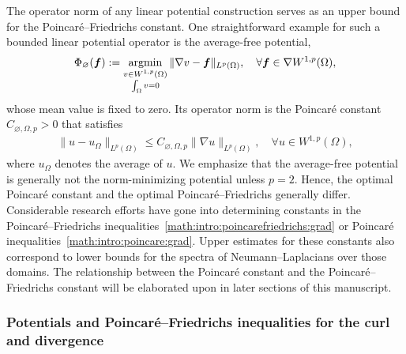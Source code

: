 \documentclass[10pt,a4paper]{article}
\begin{document}
The operator norm of any linear potential construction serves as an upper bound for the Poincar\'e--Friedrichs constant. 
One straightforward example for such a bounded linear potential operator is the average-free potential,
\begin{align}\label{math:intro:poincarepotential}
    \Phi_{\varnothing}( \bm{f} ) 
    := 
    \operatorname*{{\rm argmin}}\limits_{ \substack{ v \in W^{1,p}(\Omega) \\ \int_\Omega v = 0 } } \| \nabla v - \bm{f} \|_{L^{p}(\Omega)},
    \quad 
    \forall 
    \bm{f} \in \nabla W^{1,p}(\Omega)
    ,
\end{align} 
whose mean value is fixed to zero.
Its operator norm is the Poincar\'e constant $C_{\varnothing,\Omega,p} > 0$ that satisfies %
\begin{align}\label{math:intro:poincare:grad}
    \| u - u_{\Omega} \|_{L^{p}(\Omega)}
    \leq 
    C_{\varnothing,\Omega,p} \| \nabla u \|_{L^{p}(\Omega)},
    \quad 
    \forall 
    u \in W^{1,p}(\Omega)
    , \tag{P} 
\end{align}
where $u_\Omega$ denotes the average of $u$. We emphasize that the average-free potential is generally not the norm-minimizing potential unless $p = 2$.
Hence, the optimal Poincar\'e constant and the optimal Poincar\'e--Friedrichs generally differ.
Considerable research efforts have gone into determining constants in the Poincar\'e--Friedrichs inequalities~\eqref{math:intro:poincarefriedrichs:grad} or Poincar\'e inequalities~\eqref{math:intro:poincare:grad}. Upper estimates for these constants also correspond to lower bounds for the spectra of Neumann--Laplacians over those domains.
The relationship between the Poincar\'e constant and the Poincar\'e--Friedrichs constant will be elaborated upon in later sections of this manuscript.



\subsubsection{Potentials and Poincar\'e--Friedrichs inequalities for the curl and divergence}
\end{document}
